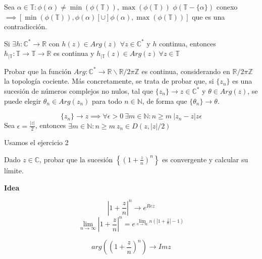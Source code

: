 Sea $\alpha\in\mathbb{T} : \phi(\alpha) \not =\min(\phi(\mathbb{T})), \max(\phi(\mathbb{T}))$ 
$\phi ( \mathbb{T}-\{ \alpha \} )$ conexo $\implies [ \min(\phi(\mathbb{T})), \phi(\alpha)[ \cup ]\phi(\alpha), \max( \phi(\mathbb{T}) ) ] $ que es una contradicción.

Si $\exists h:\mathbb{C}^{\ast} \rightarrow \mathbb{R}$ con $h(z)\in Arg(z)$ $\forall z\in\mathbb{C}^{\ast}$ y $h$ continua, entonces
$h_{| \mathbb{T}} : \mathbb{T} \rightarrow \mathbb{T} \rightarrow \mathbb{R}$ es continua y $h_{|\mathbb{T}} (z) \in Arg(z) \ \forall z\in\mathbb{T}$


\begin{ejer}
	Probar que la función $Arg : \mathbb{C}^{\ast} \rightarrow \mathbb{R}\backslash \mathbb{R}/2\pi\mathbb{Z}$ es continua, considerando en $\mathbb{R}/2\pi\mathbb{Z}$ la topología cociente. Más concretamente, se trata de probar que, si $\{z_n\}$ es una sucesión de números complejos no nulos, tal que $\{z_n\} \rightarrow z\in\mathbb{C}^{\ast}$ y $\theta\in Arg(z)$, se puede elegir $\theta_n\in Arg(z_n)$ para todo $n\in\mathbb{N}$, de forma que $\{ \theta_n \} \rightarrow \theta$.
\end{ejer}




\begin{sol}


$$
\{ z_n \} \rightarrow z \implies \forall \epsilon>0\ \exists m\in\mathbb{N} : n\geq m \ |z_n-z|z\epsilon
$$
Sea $\epsilon = \frac{|z|}{2}$, entonces 
$\exists m\in\mathbb{N} :  n\geq m\ z_n\in D(z, |z|/2)$

Usamos el ejercicio 2
\end{sol}



\begin{ejer}
	Dado $z\in\mathbb{C}$, probar que la sucesión $\left\{ \left( 1+\frac{z}{n} \right)^n \right\}$ es convergente y calcular su límite.
\end{ejer}


\textbf{Idea}


$$
|1+\frac{z}{n}|^n \rightarrow e^{Re z}
$$
$$
\lim_{n\rightarrow\infty} |1+\frac{z}{n}|^n 
= e^{ \lim_{n\rightarrow\infty} n(|1+\frac{z}{n}|-1) }
$$

$$
arg((1+\frac{z}{n})^n) \rightarrow Im z
$$

